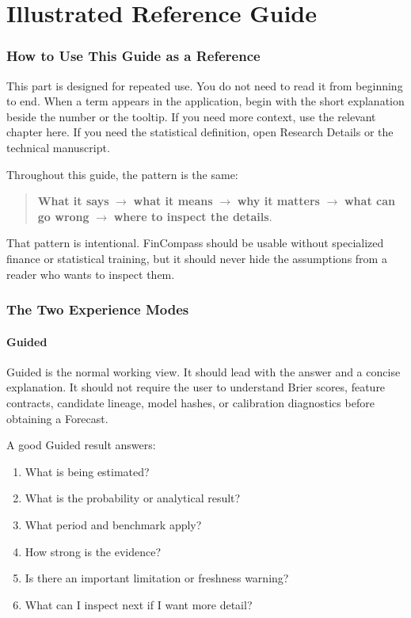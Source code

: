 \documentclass[11pt]{article}
\begin{document}
\clearpage
\setcounter{section}{0}
\renewcommand{\thesection}{\arabic{section}}
\part{Illustrated Reference Guide}

\section{How to Use This Guide as a Reference}
This part is designed for repeated use. You do not need to read it from beginning to end. When a term appears in the application, begin with the short explanation beside the number or the tooltip. If you need more context, use the relevant chapter here. If you need the statistical definition, open Research Details or the technical manuscript.

Throughout this guide, the pattern is the same:
\begin{quote}
\textbf{What it says} $\rightarrow$ \textbf{what it means} $\rightarrow$ \textbf{why it matters} $\rightarrow$ \textbf{what can go wrong} $\rightarrow$ \textbf{where to inspect the details}.
\end{quote}
That pattern is intentional. FinCompass should be usable without specialized finance or statistical training, but it should never hide the assumptions from a reader who wants to inspect them.

\section{The Two Experience Modes}
\subsection{Guided}
Guided is the normal working view. It should lead with the answer and a concise explanation. It should not require the user to understand Brier scores, feature contracts, candidate lineage, model hashes, or calibration diagnostics before obtaining a Forecast.

A good Guided result answers:
\begin{enumerate}[itemsep=0.2em]
\item What is being estimated?
\item What is the probability or analytical result?
\item What period and benchmark apply?
\item How strong is the evidence?
\item Is there an important limitation or freshness warning?
\item What can I inspect next if I want more detail?
\end{enumerate}
\end{document}

